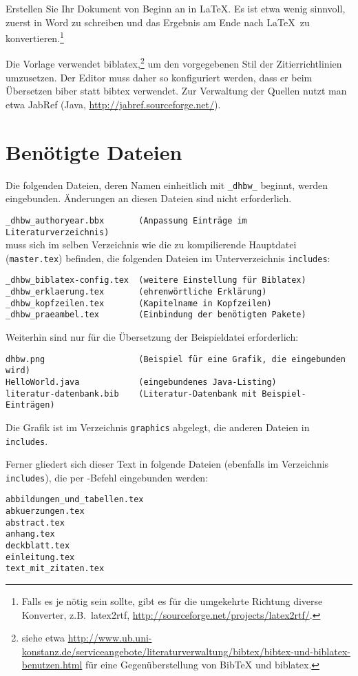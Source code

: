 Erstellen Sie Ihr Dokument von Beginn an in \LaTeX. Es ist etwa wenig sinnvoll, zuerst in Word zu schreiben und das Ergebnis am Ende nach \LaTeX\ zu konvertieren.\footnote{Falls es je nötig sein sollte, gibt es für die umgekehrte Richtung diverse Konverter, z.B.\ latex2rtf, \url{http://sourceforge.net/projects/latex2rtf/}.} 

   
Die Vorlage verwendet biblatex,\footnote{siehe etwa \url{http://www.ub.uni-konstanz.de/serviceangebote/literaturverwaltung/bibtex/bibtex-und-biblatex-benutzen.html} für eine Gegenüberstellung von BibTeX und biblatex.}
um den vorgegebenen Stil der Zitierrichtlinien umzusetzen. Der Editor muss daher so konfiguriert werden, dass er beim Übersetzen biber statt bibtex verwendet. Zur Verwaltung der Quellen nutzt man etwa JabRef (Java, \url{http://jabref.sourceforge.net/}).

\section{Benötigte Dateien}

Die folgenden Dateien, deren Namen einheitlich mit \verb|_dhbw_| beginnt, werden eingebunden. Änderungen an diesen Dateien sind nicht erforderlich.

\verb|_dhbw_authoryear.bbx       (Anpassung Einträge im Literaturverzeichnis)| \\
muss sich im selben Verzeichnis wie die zu kompilierende Hauptdatei (\verb|master.tex|) befinden, die folgenden Dateien im Unterverzeichnis \verb|includes|:
\begin{verbatim}
_dhbw_biblatex-config.tex  (weitere Einstellung für Biblatex)
_dhbw_erklaerung.tex       (ehrenwörtliche Erklärung)
_dhbw_kopfzeilen.tex       (Kapitelname in Kopfzeilen) 
_dhbw_praeambel.tex        (Einbindung der benötigten Pakete)
\end{verbatim}

Weiterhin sind nur für die Übersetzung der Beispieldatei erforderlich:
\begin{verbatim}
dhbw.png                   (Beispiel für eine Grafik, die eingebunden wird)
HelloWorld.java            (eingebundenes Java-Listing)
literatur-datenbank.bib    (Literatur-Datenbank mit Beispiel-Einträgen)
\end{verbatim}
Die Grafik ist im Verzeichnis \verb|graphics| abgelegt, die anderen Dateien in \verb|includes|. 

Ferner gliedert sich dieser Text in folgende Dateien (ebenfalls im Verzeichnis \verb|includes|), die per \verb||-Befehl eingebunden werden:
\begin{verbatim}
abbildungen_und_tabellen.tex
abkuerzungen.tex
abstract.tex
anhang.tex
deckblatt.tex
einleitung.tex
text_mit_zitaten.tex
\end{verbatim}

